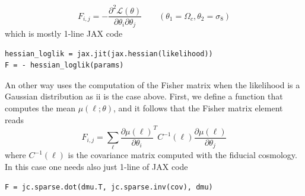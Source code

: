 \documentclass[twocolumn,twocolappendix,nofootinbib,iop]{openjournal}
\begin{document}
\begin{equation}
F_{i,j} = - \frac{\partial^2\mathcal{L}(\theta)}{\partial \theta_i \partial \theta_j}
\qquad (\theta_1=\Omega_c, \theta_2=\sigma_8)
\label{eq:fisher_way1}
\end{equation}
which is mostly  1-line JAX code
\begin{lstlisting}[language=iPython]
hessian_loglik = jax.jit(jax.hessian(likelihood))
F = - hessian_loglik(params)
\end{lstlisting}
An other way uses the computation of the Fisher matrix when the likelihood is a Gaussian distribution as ii is the case above. First, we define a function that computes the mean  $\mu(\ell; \theta)$, and it follows that the Fisher matrix element reads
\begin{equation}
    F_{i,j} = \sum_\ell \frac{\partial \mu(\ell)}{\partial \theta_i}^T C^{-1}(\ell)\frac{\partial \mu(\ell)}{\partial \theta_j}
    \label{eq:fisher_way2}
\end{equation}
where $C^{-1}(\ell)$ is the covariance matrix computed with the fiducial cosmology. In this case one needs also just 1-line of JAX code 
\begin{lstlisting}[language=iPython]
F = jc.sparse.dot(dmu.T, jc.sparse.inv(cov), dmu)
\end{lstlisting}
\end{document}
